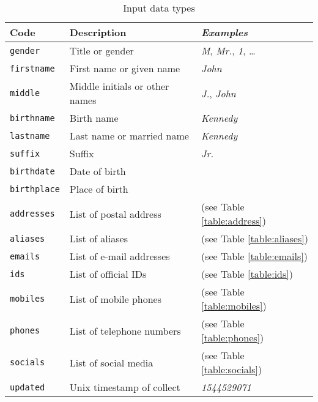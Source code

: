 \documentclass[twoside,twocolumn]{article}
\theoremstyle{definition}
\theoremstyle{remark}
\begin{document}
\begin{table*}
    \centering
    \caption{Input data types}
    \begin{tabular*}{0.75\textwidth}{l|l||l}
        Code & Description & \textit{Examples} \\
        \hline \hline
        \texttt{gender} & Title or gender & \textit{M}, \textit{Mr.}, \textit{1}, \dots \\
        \hline
        \texttt{firstname} & First name or given name & \textit{John} \\
        \hline
        \texttt{middle} & Middle initials or other names & \textit{J.}, \textit{John} \\
        \hline
        \texttt{birthname} & Birth name & \textit{Kennedy} \\
        \hline
        \texttt{lastname} & Last name or married name & \textit{Kennedy} \\
        \hline
        \texttt{suffix} & Suffix & \textit{Jr.} \\
        \hline
        \texttt{birthdate} & Date of birth & \\
        \hline
        \texttt{birthplace} & Place of birth & \\
        \hline
        \texttt{addresses} & List of postal address & (see Table \ref{table:address}) \\
        \hline
        \texttt{aliases} & List of aliases & (see Table \ref{table:aliases}) \\
        \hline
        \texttt{emails} & List of e-mail addresses & (see Table \ref{table:emails}) \\
        \hline
        \texttt{ids} & List of official IDs & (see Table \ref{table:ids}) \\
        \hline
        \texttt{mobiles} & List of mobile phones & (see Table \ref{table:mobiles}) \\
        \hline
        \texttt{phones} & List of telephone numbers & (see Table \ref{table:phones}) \\
        \hline
        \texttt{socials} & List of social media & (see Table \ref{table:socials}) \\
        \hline
        \texttt{updated} & Unix timestamp of collect & \textit{1544529071}
        \label{table:inputTypes}
    \end{tabular*}
\end{table*}
\end{document}
